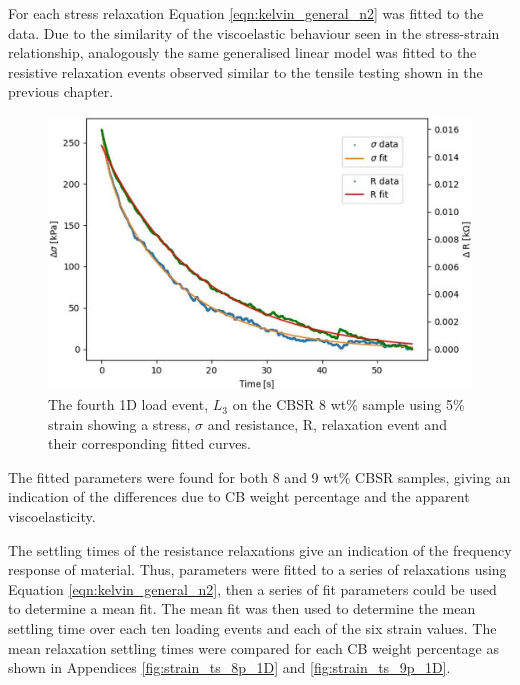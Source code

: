 For each stress relaxation Equation \ref{eqn:kelvin_general_n2} was fitted to the data. Due to the similarity of  the viscoelastic behaviour seen in the stress-strain relationship, analogously the same generalised linear model was fitted to the resistive relaxation events observed similar to the tensile testing shown in the previous chapter.
\begin{figure}[H]
    \centering
    \includegraphics[width=0.7\linewidth]{Figures/Push event 3 - CBSR 8 wt 5p strain - 1D compression test.jpg}
    \caption{The fourth 1D load event, $L_{3}$ on the CBSR 8 wt\% sample using 5\% strain showing a stress, $\sigma$ and resistance, R, relaxation event and their corresponding fitted curves.}
    \label{fig:push_event_relax_example}
\end{figure}
The fitted parameters were found for both 8 and 9 wt\% CBSR samples, giving an indication of the differences due to CB weight percentage and the apparent viscoelasticity.

The settling times of the resistance relaxations give an indication of the frequency response of material. Thus, parameters were fitted to a series of relaxations using Equation \ref{eqn:kelvin_general_n2}, then a series of fit parameters could be used to determine a mean fit. The mean fit was then used to determine the mean settling time over each ten loading events and each of the six strain values. The mean relaxation settling times were compared for each CB weight percentage as shown in Appendices \ref{fig:strain_ts_8p_1D} and \ref{fig:strain_ts_9p_1D}.




